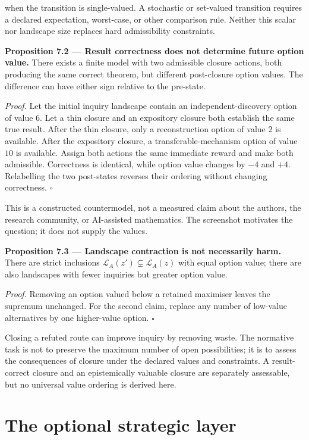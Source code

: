 \documentclass[11pt,a4paper]{article}
\begin{document}
when the transition is single-valued. A stochastic or set-valued
transition requires a declared expectation, worst-case, or other
comparison rule. Neither this scalar nor landscape size replaces hard
admissibility constraints.


\textbf{Proposition 7.2 --- Result correctness does not determine future
option value.} There exists a finite model with two admissible closure
actions, both producing the same correct theorem, but different
post-closure option values. The difference can have either sign relative
to the pre-state.

\emph{Proof.} Let the initial inquiry landscape contain an
independent-discovery option of value \(6\). Let a thin closure and an
expository closure both establish the same true result. After the thin
closure, only a reconstruction option of value \(2\) is available. After
the expository closure, a transferable-mechanism option of value \(10\)
is available. Assign both actions the same immediate reward and make
both admissible. Correctness is identical, while option value changes by
\(-4\) and \(+4\). Relabelling the two post-states reverses their
ordering without changing correctness. \(\square\)

This is a constructed countermodel, not a measured claim about the
authors, the research community, or AI-assisted mathematics. The
screenshot motivates the question; it does not supply the values.


\textbf{Proposition 7.3 --- Landscape contraction is not necessarily
harm.} There are strict inclusions
\(\mathcal L_A(z')\subsetneq\mathcal L_A(z)\) with equal option value;
there are also landscapes with fewer inquiries but greater option value.

\emph{Proof.} Removing an option valued below a retained maximiser
leaves the supremum unchanged. For the second claim, replace any number
of low-value alternatives by one higher-value option. \(\square\)

Closing a refuted route can improve inquiry by removing waste. The
normative task is not to preserve the maximum number of open
possibilities; it is to assess the consequences of closure under the
declared values and constraints. A result-correct closure and an
epistemically valuable closure are separately assessable, but no
universal value ordering is derived here.

\section{The optional strategic
layer}\label{the-optional-strategic-layer}
\end{document}
